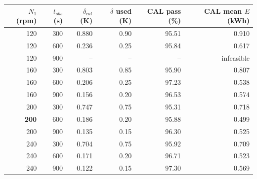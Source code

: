 \begin{tabular}{rrrrrr}
\toprule
$N_1$ (rpm) & $t_{obs}$ (s) & $\delta_{cal}$ (K) & $\delta$ used (K) & CAL pass (\%) & CAL mean $E$ (kWh) \\
\midrule
120 & 300 & 0.880 & 0.90 & 95.51 & 0.910 \\
120 & 600 & 0.236 & 0.25 & 95.84 & 0.617 \\
120 & 900 & -- & -- & -- & infeasible \\
160 & 300 & 0.803 & 0.85 & 95.90 & 0.807 \\
160 & 600 & 0.206 & 0.25 & 97.23 & 0.538 \\
160 & 900 & 0.156 & 0.20 & 96.53 & 0.574 \\
200 & 300 & 0.747 & 0.75 & 95.31 & 0.718 \\
\textbf{200} & 600 & 0.186 & 0.20 & 95.88 & 0.499 \\
200 & 900 & 0.135 & 0.15 & 96.30 & 0.525 \\
240 & 300 & 0.704 & 0.75 & 95.92 & 0.709 \\
240 & 600 & 0.171 & 0.20 & 96.71 & 0.523 \\
240 & 900 & 0.122 & 0.15 & 97.30 & 0.569 \\
\bottomrule
\end{tabular}
